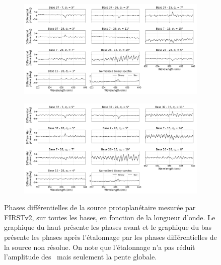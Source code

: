 \begin{figure}[ht!]
    \centering
    \begin{subfigure}{\textwidth}
        \centering
        \includegraphics[width=\textwidth]{Figure_Chap4/20221010_Bin01_SpeDiffPhase_Raw_BaseSubplot_Pola1_LaTex.png}
    \end{subfigure}
    \begin{subfigure}{\textwidth}
        \centering
        \includegraphics[width=\textwidth]{Figure_Chap4/20221010_Bin01_SpeDiffPhase_Calp2vm_BaseSubplot_Pola1_LaTex.png}
    \end{subfigure}
    \caption[Phases différentielles de la source protoplanétaire mesurée par FIRSTv2.]{Phases différentielles de la source protoplanétaire mesurée par FIRSTv2, sur toutes les bases, en fonction de la longueur d'onde. Le graphique du haut présente les phases avant et le graphique du bas présente les phases après l'étalonnage par les phases différentielles de la source non résolue. On note que l'étalonnage n'a pas réduit l'amplitude des \wiggles~mais seulement la pente globale.}
    \label{fig:PhaseDiffBinary}
\end{figure}

